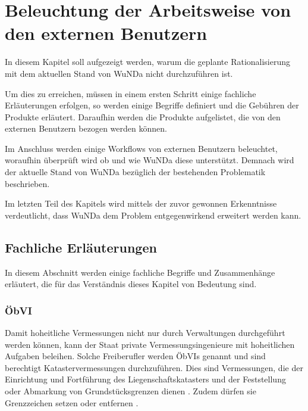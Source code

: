\chapter{Beleuchtung der Arbeitsweise von den externen Benutzern}

In diesem Kapitel soll aufgezeigt werden, warum die geplante Rationalisierung mit dem aktuellen Stand von \ac{WuNDa} nicht durchzuführen ist.

Um dies zu erreichen, müssen in einem ersten Schritt einige fachliche Erläuterungen erfolgen, so werden einige Begriffe definiert und die Gebühren der Produkte erläutert.
Daraufhin werden die Produkte aufgelistet, die von den externen Benutzern bezogen werden können.

Im Anschluss werden einige Workflows von externen Benutzern beleuchtet, woraufhin überprüft wird ob und wie \ac{WuNDa} diese unterstützt. Demnach wird der aktuelle Stand von \ac{WuNDa} bezüglich der bestehenden Problematik beschrieben.

Im letzten Teil des Kapitels wird mittels der zuvor gewonnen Erkenntnisse verdeutlicht, dass \ac{WuNDa} dem Problem entgegenwirkend erweitert werden kann. 


\section{Fachliche Erläuterungen}
In diesem Abschnitt werden einige fachliche Begriffe und Zusammenhänge erläutert, die für das Verständnis dieses Kapitel von Bedeutung sind.

\subsection{ÖbVI}
Damit hoheitliche Vermessungen nicht nur durch Verwaltungen durchgeführt werden können, kann der Staat private Vermessungsingenieure mit hoheitlichen Aufgaben beleihen.
Solche Freiberufler werden \acfp{ÖbVI} genannt und sind berechtigt Katastervermessungen durchzuführen. Dies sind Vermessungen, die der Einrichtung und Fortführung des Liegenschaftskatasters und der Feststellung oder Abmarkung von Grundstücksgrenzen dienen \autocite[vgl.][]{bdvi-oebvi}.
Zudem dürfen sie Grenzzeichen setzen oder entfernen \autocite[vgl.][]{wolff-oebvi}.

